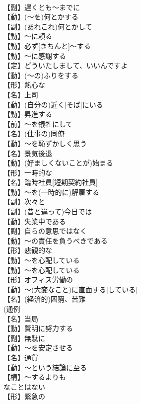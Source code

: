 \documentclass[8pt]{extreport}
\begin{document}
\begin{CJK}{UTF8}{min}
\\	【副】遅くとも～までに
\\	【動】(～を)何とかする
\\	【副】(あれこれ)何とかして
\\	【動】～に頼る
\\	【動】必ず[きちんと]～する
\\	【動】～に感謝する
\\	【定】どういたしまして、いいんですよ
\\	【動】(～の)ふりをする
\\	【形】熱心な
\\	【名】上司
\\	【動】(自分の)近く[そば]にいる
\\	【動】昇進する
\\	【前】～を犠牲にして
\\	【名】(仕事の)同僚
\\	【動】～を恥ずかしく思う
\\	【名】景気後退
\\	【動】(好ましくないことが)始まる
\\	【形】一時的な
\\	【名】臨時社員[短期契約社員]
\\	【動】～を(一時的に)解雇する
\\	【副】次々と
\\	【副】(昔と違って)今日では
\\	【動】失業中である
\\	【副】自らの意思ではなく
\\	【動】～の責任を負うべきである
\\	【形】悲観的な
\\	【動】～を心配している
\\	【動】～を心配している
\\	【形】オフィス労働の
\\	【動】～(大変なこと)に直面する[している]
\\	【名】(経済的)困窮、苦難
\\	(通例 
\\	【名】当局
\\	【動】賢明に努力する
\\	【副】無駄に
\\	【動】～を安定させる
\\	【名】通貨
\\	【動】～という結論に至る
\\	【構】～するよりも
\\	なことはない
\\	【形】緊急の

\end{CJK}
\end{document}
